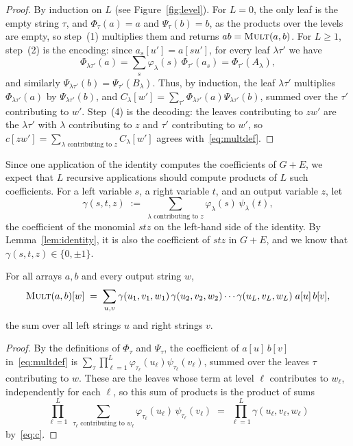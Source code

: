 \begin{proof}
By induction on $L$ (see Figure~\ref{fig:level}). For $L=0$, the only leaf is the empty string $\tau$, and $\Phi_\tau(a)=a$ and $\Psi_\tau(b)=b$, as the products over the levels are empty, so step~(1) multiplies them and returns $ab=\textnormal{\textsc{Mult}}(a,b)$. For $L\ge1$, step~(2) is the encoding: since $a_s[u']=a[su']$, for every leaf $\lambda\tau'$ we have
\[
\Phi_{\lambda\tau'}(a)=\sum_s\varphi_\lambda(s)\,\Phi_{\tau'}(a_s)=\Phi_{\tau'}(A_\lambda),
\]
and similarly $\Psi_{\lambda\tau'}(b)=\Psi_{\tau'}(B_\lambda)$. Thus, by induction, the leaf $\lambda\tau'$ multiplies $\Phi_{\lambda\tau'}(a)$ by $\Psi_{\lambda\tau'}(b)$, and $C_\lambda[w']=\sum_{\tau'}\Phi_{\lambda\tau'}(a)\Psi_{\lambda\tau'}(b)$, summed over the $\tau'$ contributing to $w'$. Step~(4) is the decoding: the leaves contributing to $zw'$ are the $\lambda\tau'$ with $\lambda$ contributing to $z$ and $\tau'$ contributing to $w'$, so $c[zw']=\sum_{\lambda\text{ contributing to }z}C_\lambda[w']$ agrees with~\eqref{eq:multdef}.
\end{proof}

Since one application of the identity computes the coefficients of $G+E$, we expect that $L$ recursive applications should compute products of $L$ such coefficients. For a left variable $s$, a right variable $t$, and an output variable $z$, let
\begin{equation}\label{eq:c}
\gamma(s,t,z)\;:=\;\sum_{\lambda\text{ contributing to }z}\varphi_\lambda(s)\,\psi_\lambda(t),
\end{equation}
the coefficient of the monomial $stz$ on the left-hand side of the identity. By Lemma~\ref{lem:identity}, it is also the coefficient of $stz$ in $G+E$, and we know that $\gamma(s,t,z)\in\{0,\pm1\}$.

\begin{lemma}\label{lem:mult}
For all arrays $a,b$ and every output string $w$,
\[
\textnormal{\textsc{Mult}}(a,b)[w]\;=\;\sum_{u,v}\gamma(u_1,v_1,w_1)\,\gamma(u_2,v_2,w_2)\cdots\gamma(u_L,v_L,w_L)\;a[u]\,b[v],
\]
the sum over all left strings $u$ and right strings $v$.
\end{lemma}

\begin{proof}
By the definitions of $\Phi_\tau$ and $\Psi_\tau$, the coefficient of $a[u]\,b[v]$ in~\eqref{eq:multdef} is $\sum_\tau\prod_{\ell=1}^{L}\varphi_{\tau_\ell}(u_\ell)\psi_{\tau_\ell}(v_\ell)$, summed over the leaves $\tau$ contributing to $w$. These are the leaves whose term at level $\ell$ contributes to $w_\ell$, independently for each $\ell$, so this sum of products is the product of sums
\[
\prod_{\ell=1}^{L}\ \sum_{\tau_\ell\text{ contributing to }w_\ell}\varphi_{\tau_\ell}(u_\ell)\,\psi_{\tau_\ell}(v_\ell)\;=\;\prod_{\ell=1}^{L}\gamma(u_\ell,v_\ell,w_\ell)
\]
by~\eqref{eq:c}.
\end{proof}

